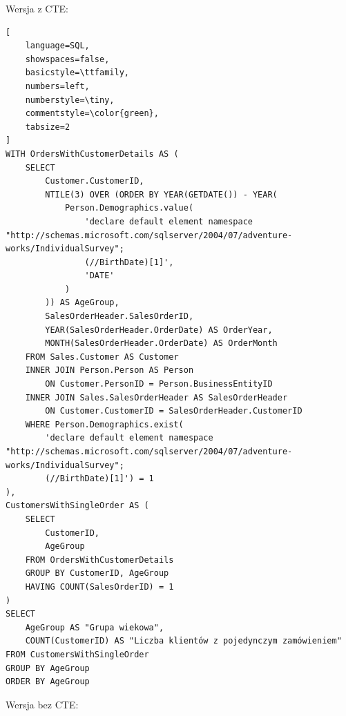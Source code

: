 \documentclass[a4paper,12pt]{article}
\begin{document}
Wersja z CTE:

{\small
\begin{lstlisting}[
	language=SQL,
	showspaces=false,
	basicstyle=\ttfamily,
	numbers=left,
	numberstyle=\tiny,
	commentstyle=\color{green},
	tabsize=2
]
WITH OrdersWithCustomerDetails AS (
    SELECT 
        Customer.CustomerID,
        NTILE(3) OVER (ORDER BY YEAR(GETDATE()) - YEAR(
            Person.Demographics.value(
                'declare default element namespace 
"http://schemas.microsoft.com/sqlserver/2004/07/adventure-works/IndividualSurvey";
                (//BirthDate)[1]', 
                'DATE'
            )
        )) AS AgeGroup,
        SalesOrderHeader.SalesOrderID,
        YEAR(SalesOrderHeader.OrderDate) AS OrderYear,
        MONTH(SalesOrderHeader.OrderDate) AS OrderMonth
    FROM Sales.Customer AS Customer
    INNER JOIN Person.Person AS Person
        ON Customer.PersonID = Person.BusinessEntityID
    INNER JOIN Sales.SalesOrderHeader AS SalesOrderHeader
        ON Customer.CustomerID = SalesOrderHeader.CustomerID
    WHERE Person.Demographics.exist(
        'declare default element namespace 
"http://schemas.microsoft.com/sqlserver/2004/07/adventure-works/IndividualSurvey";
        (//BirthDate)[1]') = 1
),
CustomersWithSingleOrder AS (
    SELECT
        CustomerID,
        AgeGroup
    FROM OrdersWithCustomerDetails
    GROUP BY CustomerID, AgeGroup
    HAVING COUNT(SalesOrderID) = 1
)
SELECT
    AgeGroup AS "Grupa wiekowa",
    COUNT(CustomerID) AS "Liczba klientów z pojedynczym zamówieniem"
FROM CustomersWithSingleOrder
GROUP BY AgeGroup
ORDER BY AgeGroup
\end{lstlisting}}

Wersja bez CTE:
\end{document}
